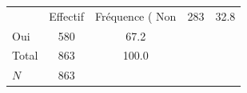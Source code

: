 {
\def\sym#1{\ifmmode^{#1}\else\(^{#1}\)\fi}
\begin{tabular}{l*{1}{cc}}
\toprule
            &    Effectif&Fréquence (%
\midrule
Non         &         283&        32.8\\
Oui         &         580&        67.2\\
Total       &         863&       100.0\\
\midrule
\(N\)       &         863&            \\
\bottomrule
\end{tabular}
}
